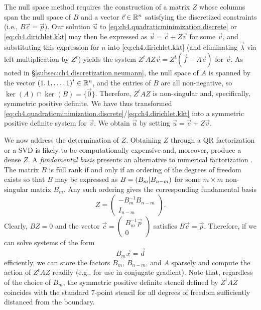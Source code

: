The null space method requires the construction of a matrix $Z$ whose columns span the null space of $B$ and a vector $\vec{c} \in \mathbb{R}^n$ satisfying the discretized constraints (i.e., $B \vec{c} = \vec{p}$). Our solution $\vec{u}$ to \eqref{eq:ch4.quadraticminimization.discrete} or \eqref{eq:ch4.dirichlet.kkt} may then be expressed as $\vec{u} = \vec{c} + Z \vec{v}$ for some $\vec{v}$, and substituting this expression for $u$ into \eqref{eq:ch4.dirichlet.kkt} (and eliminating $\vec{\lambda}$ via left multiplication by $Z^t$) yields the system $Z^tAZ \vec{v} = Z^t (\vec{f} - A \vec{c})$ for $\vec{v}$. As noted in \S\ref{subsec:ch4.discretization.neumann}, the null space of $A$ is spanned by the vector $(1, 1, \dotsc, 1)^t \in \mathbb{R}^n$, and the entries of $B$ are all non-negative, so $\ker(A) \cap \ker(B) = \{\vec{0}\}$. Therefore, $Z^tAZ$ is non-singular and, specifically, symmetric positive definite. We have thus transformed \eqref{eq:ch4.quadraticminimization.discrete}/\eqref{eq:ch4.dirichlet.kkt} into a symmetric positive definite system for $\vec{v}$. We obtain $\vec{u}$ by setting $\vec{u} = \vec{c} + Z \vec{v}$.

We now address the determination of $Z$. Obtaining $Z$ through a QR factorization or a SVD is likely to be computationally expensive and, moreover, produce a dense $Z$. A \emph{fundamental basis} presents an alternative to numerical factorization \cite{Benzi05}. The matrix $B$ is full rank if and only if an ordering of the degrees of freedom exists so that $B$ may be expressed as $B = \left( B_m | B_{n-m} \right)$ for some $m \times m$ non-singular matrix $B_m$. Any such ordering gives the corresponding fundamental basis
\begin{equation} \label{eq:ch4.fundamentalbasis}
Z = \begin{pmatrix} -B_m^{-1} B_{n-m} \\ I_{n-m} \end{pmatrix}.
\end{equation}
Clearly, $BZ = 0$ and the vector $\vec{c} = \begin{pmatrix} B_m^{-1} \vec{p} \\ 0 \end{pmatrix}$ satisfies $B \vec{c} = \vec{p}$. Therefore, if we can solve systems of the form
\begin{equation} \label{eq:ch4.bmsystem}
B_m \vec{x} = \vec{d}
\end{equation}
efficiently, we can store the factors $B_m$, $B_{n-m}$, and $A$ sparsely and compute the action of $Z^tAZ$ readily (e.g., for use in conjugate gradient). Note that, regardless of the choice of $B_m$, the symmetric positive definite stencil defined by $Z^tAZ$ coincides with the standard $7$-point stencil for all degrees of freedom sufficiently distanced from the boundary.

